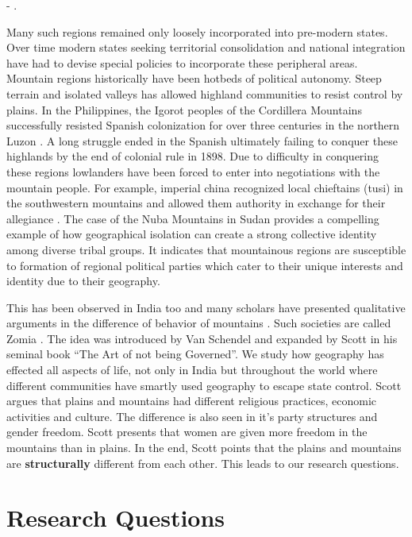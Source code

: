 \hspace*{\fill} - \cite{Hammes2017}. 



Many such regions remained only loosely incorporated into pre-modern states. Over time modern states seeking territorial consolidation and national integration have had to devise special policies to incorporate these peripheral areas. Mountain regions historically have been hotbeds of political autonomy. Steep terrain and isolated valleys has allowed highland communities to  resist control by plains. In the Philippines, the Igorot peoples of the Cordillera Mountains successfully resisted Spanish colonization for over three centuries in the northern Luzon \citep{scott1970igorot}. A long struggle ended in the Spanish ultimately failing to conquer these highlands by the end of colonial rule in 1898. Due to difficulty in conquering these regions lowlanders have been forced to enter into negotiations with the mountain people. For example, imperial china  recognized local chieftains (tusi) in the southwestern mountains and allowed them authority in exchange for their allegiance \citep{took2005native}.  The case of the Nuba Mountains in Sudan provides a compelling example of how geographical isolation can create a strong collective identity among diverse tribal groups. It indicates that mountainous regions are susceptible to formation of regional political parties which cater to their unique interests and identity due to their geography.

This has been observed in India too and many scholars have presented qualitative arguments in the difference of behavior of mountains \citep{ali2019delusional,murton2013himalayan,alam2008becoming,hussain2015remoteness}. Such societies are called Zomia \citep{van2005geographies}. The idea was introduced by Van Schendel and expanded by Scott in his seminal book ``The Art of not being Governed''. We study how geography has effected all aspects of life, not only in India but throughout the world where different communities have smartly used geography to escape state control. Scott argues that plains and mountains had different religious practices, economic activities and culture. The difference is also seen in it's party structures and gender freedom. Scott presents that women are given more freedom in the mountains than in plains. In the end, Scott points that the plains and mountains are \textbf{structurally} different from each other. This leads to our research questions.

\section{Research Questions}

